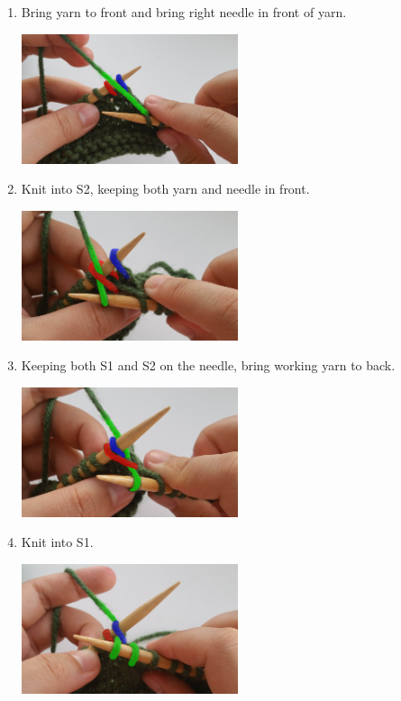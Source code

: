 \documentclass[12pt]{article}
\begin{document}
\begin{multicols}{2}
\begin{enumerate}
\item Bring yarn to front and bring right needle in front of yarn.

\includegraphics[width=2.5in]{rt_step1.jpg}

\item Knit into S2, keeping both yarn and needle in front.

\includegraphics[width=2.5in]{rt_step2.jpg}

\item Keeping both S1 and S2 on the needle, bring working yarn to back.

\includegraphics[width=2.5in]{rt_step3.jpg}

\vfill \columnbreak

\item Knit into S1.

\includegraphics[width=2.5in]{rt_step5.jpg}


\end{enumerate}
\end{multicols}
\end{document}

